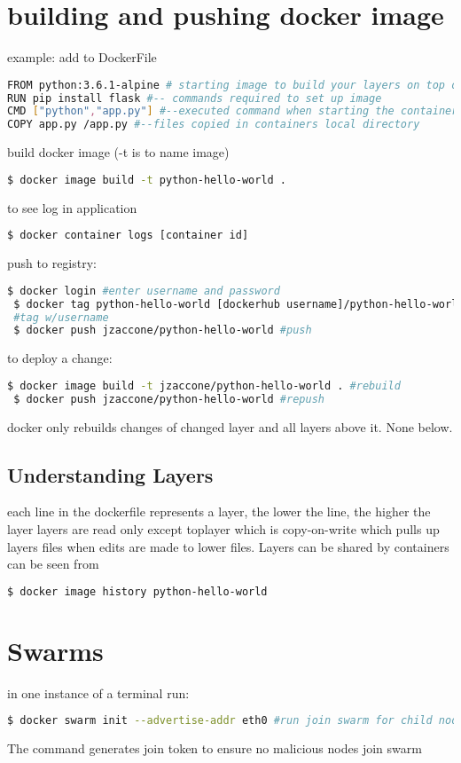 \documentclass{article}
\begin{document}
 \section{building and pushing docker image}
 example: add to DockerFile 
 \begin{lstlisting}[language=bash]
FROM python:3.6.1-alpine # starting image to build your layers on top of
RUN pip install flask #-- commands required to set up image
CMD ["python","app.py"] #--executed command when starting the container
COPY app.py /app.py #--files copied in containers local directory
 \end{lstlisting}
build docker image (-t is to name image)
 \begin{lstlisting}[language=bash]
$ docker image build -t python-hello-world .
 \end{lstlisting}
 to see log in application
  \begin{lstlisting}[language=bash]
   $ docker container logs [container id]
 \end{lstlisting}
 push to registry:
   \begin{lstlisting}[language=bash]
 $ docker login #enter username and password
 $ docker tag python-hello-world [dockerhub username]/python-hello-world 
 #tag w/username
 $ docker push jzaccone/python-hello-world #push
  \end{lstlisting}
  to deploy a change: 
    \begin{lstlisting}[language=bash]
 $ docker image build -t jzaccone/python-hello-world . #rebuild
 $ docker push jzaccone/python-hello-world #repush
  \end{lstlisting}
  docker only rebuilds changes of changed layer and all layers above it. None below. 
  \subsection{Understanding Layers}
  each line in the dockerfile represents a layer, the lower the line, the higher the layer
  layers are read only except toplayer which is copy-on-write which pulls up layers files when edits are made to lower files.
  Layers can be shared by containers 
  can be seen from 
   \begin{lstlisting}[language=bash]
  $ docker image history python-hello-world
   \end{lstlisting}
  \section{Swarms}
  in one instance of a terminal run:
  \begin{lstlisting}[language=bash]
$ docker swarm init --advertise-addr eth0 #run join swarm for child nodes
   \end{lstlisting}
   The command generates join token to ensure no malicious nodes join swarm 
   
\end{document}

